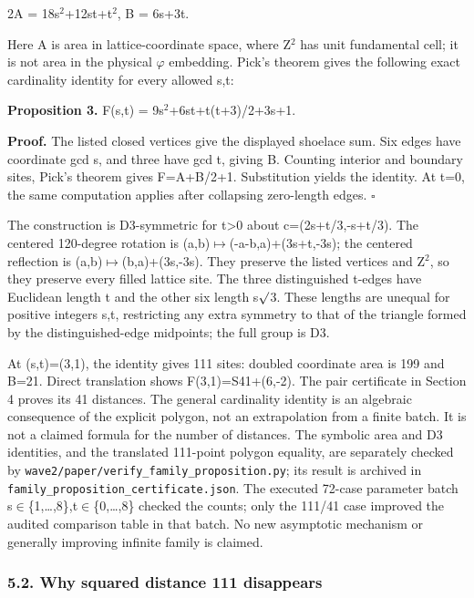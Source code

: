 \documentclass[
]{article}
\begin{document}
2A = 18s\ensuremath{{}^2}+12st+t\ensuremath{{}^2}, B = 6s+3t.

Here A is area in lattice-coordinate space, where Z\ensuremath{{}^2} has unit
fundamental cell; it is not area in the physical \ensuremath{\varphi} embedding. Pick's
theorem gives the following exact cardinality identity for every allowed
s,t:

\textbf{Proposition 3.} \textbar F(s,t)\textbar{} =
9s\ensuremath{{}^2}+6st+t(t+3)/2+3s+1.

\textbf{Proof.} The listed closed vertices give the displayed shoelace
sum. Six edges have coordinate gcd s, and three have gcd t, giving B.
Counting interior and boundary sites, Pick's theorem gives
\textbar F\textbar=A+B/2+1. Substitution yields the identity. At t=0,
the same computation applies after collapsing zero-length edges.
\(\square\)

The construction is D3-symmetric for t\textgreater0 about
c=(2s+t/3,-s+t/3). The centered 120-degree rotation is
(a,b)\ensuremath{\mapsto}(-a-b,a)+(3s+t,-3s); the centered reflection is
(a,b)\ensuremath{\mapsto}(b,a)+(3s,-3s). They preserve the listed vertices and Z\ensuremath{{}^2}, so they
preserve every filled lattice site. The three distinguished t-edges have
Euclidean length t and the other six length s\ensuremath{\surd}3. These lengths are
unequal for positive integers s,t, restricting any extra symmetry to
that of the triangle formed by the distinguished-edge midpoints; the
full group is D3.

At (s,t)=(3,1), the identity gives 111 sites: doubled coordinate area is
199 and B=21. Direct translation shows F(3,1)=S41+(6,-2). The pair
certificate in Section 4 proves its 41 distances. The general
cardinality identity is an algebraic consequence of the explicit
polygon, not an extrapolation from a finite batch. It is not a claimed
formula for the number of distances. The symbolic area and D3
identities, and the translated 111-point polygon equality, are
separately checked by
\texttt{wave2/paper/verify\_family\_proposition.py}; its result is
archived in \texttt{family\_proposition\_certificate.json}. The executed
72-case parameter batch s\ensuremath{\in}\{1,\ldots,8\},t\ensuremath{\in}\{0,\ldots,8\} checked the
counts; only the 111/41 case improved the audited comparison table in
that batch. No new asymptotic mechanism or generally improving infinite
family is claimed.

\subsubsection{5.2. Why squared distance 111
disappears}\label{why-squared-distance-111-disappears}
\end{document}
